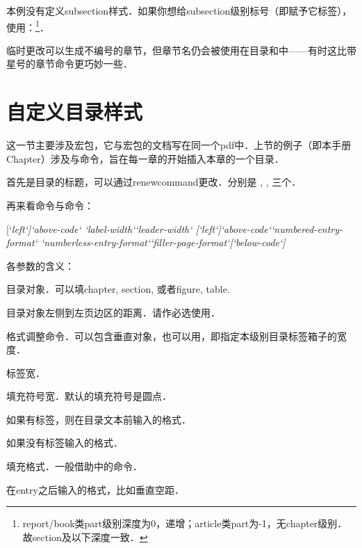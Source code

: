 本例没有定义subsection样式．如果你想给subsection级别标号（即赋予它标签），使用：\footnote{report/book类part级别深度为0，递增；article类part为-1，无chapter级别．故section及以下深度一致．}．

临时更改可以生成不编号的章节，但章节名仍会被使用在目录和中——有时这比带星号的章节命令更巧妙一些．

\section{自定义目录样式}
\label{sec:titletoc}
这一节主要涉及宏包，它与宏包的文档写在同一个pdf中．上节的例子（即本手册Chapter）涉及与命令，旨在每一章的开始插入本章的一个目录．

首先是目录的标题，可以通过renewcommand更改．分别是 , , 三个．

再来看命令与命令：
\begin{latex}
[`\itshape left`]{`\itshape above-code`}
    {`\itshape label-width`}{`\itshape leader-width`}
[`\itshape left`]{`\itshape above-code`}{`\itshape numbered-entry-format`}
    {`\itshape numberless-entry-format`}{`\itshape filler-page-format`}[`\itshape below-code`]
\end{latex}

各参数的含义：
\begin{para}
\item[section:] 目录对象．可以填chapter, section, 或者figure, table.
\item[left:] 目录对象左侧到左页边区的距离．请作必选使用．
\item[above-code:] 格式调整命令．可以包含垂直对象，也可以用，即指定本级别目录标签箱子的宽度．
\item[label-width:] 标签宽．
\item[leader-width:] 填充符号宽．默认的填充符号是圆点．
\item[numered-entry-format:] 如果有标签，则在目录文本前输入的格式．
\item[numberless-entry-format:] 如果没有标签输入的格式．
\item[filler-page-format:] 填充格式．一般借助中的命令．
\item[below-code:] 在entry之后输入的格式，比如垂直空距．
\end{para}

